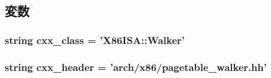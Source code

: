 \subsection{変数}
\hypertarget{classX86TLB_1_1X86PagetableWalker_a58cd55cd4023648e138237cfc0822ae3}{
\subsubsection[{cxx\_\-class}]{\setlength{\rightskip}{0pt plus 5cm}string {\bf cxx\_\-class} = '{\bf X86ISA::Walker}'}}
\label{classX86TLB_1_1X86PagetableWalker_a58cd55cd4023648e138237cfc0822ae3}
\hypertarget{classX86TLB_1_1X86PagetableWalker_a17da7064bc5c518791f0c891eff05fda}{
\subsubsection[{cxx\_\-header}]{\setlength{\rightskip}{0pt plus 5cm}string {\bf cxx\_\-header} = 'arch/x86/pagetable\_\-walker.hh'}}
\label{classX86TLB_1_1X86PagetableWalker_a17da7064bc5c518791f0c891eff05fda}


